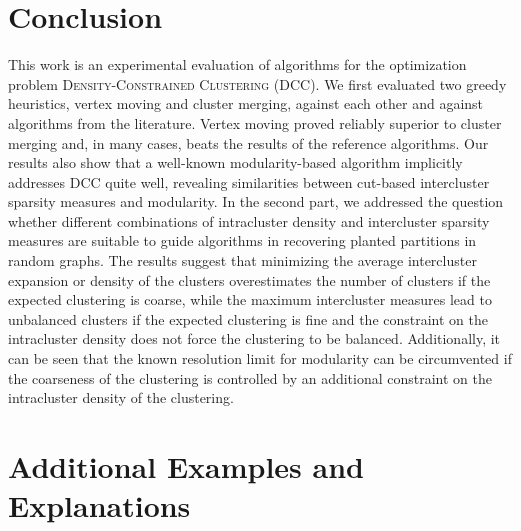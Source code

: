 \documentclass{llncs}
\begin{document}
\section{Conclusion}
This work is an experimental evaluation of algorithms for the optimization problem \textsc{Density}-\textsc{Constrained Clustering} (DCC).
We first evaluated two greedy heuristics, vertex moving and cluster merging, against each other and against algorithms from the literature.
Vertex moving proved reliably superior to cluster merging and, in many cases, beats the results of the reference algorithms.
Our results also show that a well-known modularity-based algorithm implicitly addresses DCC quite well, revealing similarities between cut-based intercluster sparsity measures and modularity.
In the second part, we addressed the question whether different combinations of intracluster density and intercluster sparsity measures are suitable to guide algorithms in recovering planted partitions in random graphs. 
The results suggest that minimizing the average intercluster expansion or density of the clusters overestimates the number of clusters if the expected clustering is coarse, while the maximum intercluster measures lead to unbalanced clusters if the expected clustering is fine and the constraint on the intracluster density does not force the clustering to be balanced.
Additionally, it can be seen that the known resolution limit for modularity can be circumvented if the coarseness of the clustering is controlled by an additional constraint on the intracluster density of the clustering. 




\newpage
\appendix
\section{Additional Examples and Explanations}
\label{app:add_ex}
\end{document}
